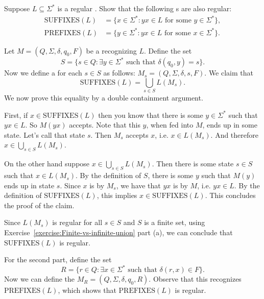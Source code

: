 \begin{flex}
\begin{exercise} \label{exercise:Regularity-of-suffixes-and-prefixes}
Suppose $L \subseteq \Sigma^*$ is a regular . 
Show that the following s are also regular:
\begin{align*}
\text{SUFFIXES}(L) & = \{x \in \Sigma^* : \text{$yx \in L$ for some $y \in \Sigma^*$}\},  \\
\text{PREFIXES}(L) & = \{y \in \Sigma^* : \text{$yx \in L$ for some $x \in  \Sigma^*$}\}.
\end{align*}
\end{exercise}

\begin{solution}
Let $M = (Q, \Sigma, \delta, q_0, F)$ be a  recognizing $L$. Define the set 
\[
    S = \{s \in Q: \exists y \in \Sigma^* \text{ such that } \delta(q_0,y) = s\}.
\]
Now we define a  for each $s \in S$ as follows: $M_s = (Q, \Sigma, \delta, s, F)$. We claim that 
\[
\text{SUFFIXES}(L) = \bigcup_{s \in S} L(M_s).
\]
We now prove this equality by a double containment argument.

First, if $x \in \text{SUFFIXES}(L)$ then you know that there is some $y \in \Sigma^*$ such that $yx \in L$. So $M(yx)$ accepts. Note that this $y$, when fed into $M$, ends up in some state. Let's call that state $s$. Then $M_s$ accepts $x$, i.e. $x \in L(M_s)$. And therefore $x \in \bigcup_{s \in S} L(M_s)$.

On the other hand suppose  $x \in \bigcup_{s \in S} L(M_s)$. Then there is some state $s \in S$ such that $x \in L(M_s)$. By the definition of $S$, there is some  $y$ such that $M(y)$ ends up in state $s$. Since $x$ is  by $M_s$, we have that $yx$ is  by $M$, i.e. $yx \in L$. By the definition of $\text{SUFFIXES}(L)$, this implies $x \in \text{SUFFIXES}(L)$. This concludes the proof of the claim.

Since $L(M_s)$ is regular for all $s \in S$ and $S$ is a finite set, using Exercise~\ref{exercise:Finite-vs-infinite-union} part (a), we can conclude that $\text{SUFFIXES}(L)$ is regular.

For the second part, define the set
\[
    R = \{r \in Q : \exists x \in \Sigma^* \text{ such that } \delta(r, x) \in F\}.
\]
Now we can define the  $M_R = (Q, \Sigma, \delta, q_0, R)$. Observe that this  recognizes $\text{PREFIXES}(L)$, which shows that $\text{PREFIXES}(L)$ is regular.
\end{solution}
\end{flex}


